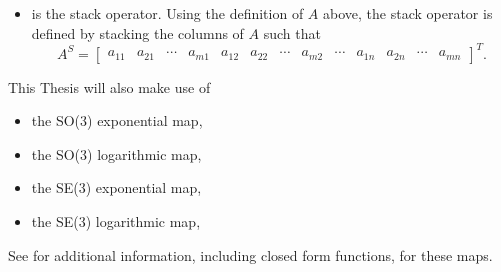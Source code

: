 \begin{itemize}
\begin{equation}
\begin{array}{cccc}
a_{11}B & a_{12}B & \hdots & a_{1n}B  \\
a_{21}B & a_{22}B &        & a_{2n}B  \\
\vdots &        & \ddots & \vdots  \\
a_{m1}B & a_{m2}B & \hdots & a_{mn}B  \\
\end{array} \right].
\end{equation}
%
%
\item {} is the
stack operator.  Using the definition of $A$ above, the stack operator is
defined by stacking the columns of $A$ such that  
%
\begin{equation}
A^S=\left[ \begin{array}{ccccccccccccc} 
a_{11}  &
a_{21}  &
\cdots &
a_{m1}  &
a_{12}  &
a_{22}  &
\cdots &
a_{m2}  & 
\cdots &
a_{1n}  &
a_{2n}  &
\cdots &
a_{mn}
\end{array} \right]^T.
\end{equation}
%
\end{itemize}
%
This Thesis will also make use of 
%
\begin{itemize}
\item the SO(3) exponential map,  
\item the SO(3) logarithmic map, 
\item the SE(3) exponential map,  
\item the SE(3) logarithmic map, 
\end{itemize}
% 
See \cite{murray&li&sastry} for additional information, including
closed form functions, for these maps.

